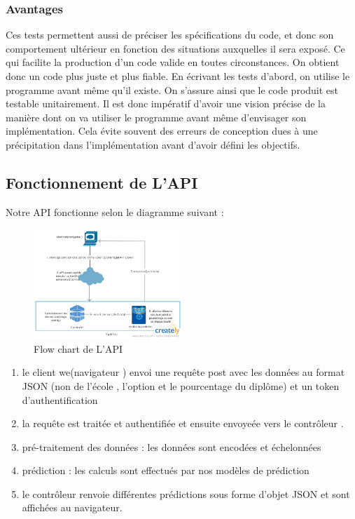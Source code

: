 \subsubsection{Avantages }
Ces tests permettent aussi de préciser les spécifications du code, et donc son comportement ultérieur en fonction des situations auxquelles il sera exposé. Ce qui facilite la production d'un code valide en toutes circonstances. On obtient donc un code plus juste et plus fiable. En écrivant les tests d'abord, on utilise le programme avant même qu'il existe. On s'assure ainsi que le code produit est testable unitairement. Il est donc impératif d'avoir une vision précise de la manière dont on va utiliser le programme avant même d'envisager son implémentation. Cela évite souvent des erreurs de conception dues à une précipitation dans l'implémentation avant d'avoir défini les objectifs.
\subsection{Fonctionnement de L'\ac{API}} 
Notre \ac{API} fonctionne selon le diagramme suivant :
\begin{figure}[H]
	\centering
	\includegraphics[width=0.5\textwidth]{fig/New-Predictive-Model.png}
	\caption{Flow chart de L'API }
	\label{fig:flowChart}
\end{figure}  
\begin{enumerate}
	\item le client we(navigateur ) envoi une requête post avec les données au format \ac{JSON} (non de l'école , l'option et le pourcentage du diplôme) et un token d'authentification 
	\item la requête est traitée et authentifiée et ensuite envoyeée vers le contrôleur .
	\item  pré-traitement des données : les données sont encodées et échelonnées 
	\item  prédiction : les calculs sont effectués par nos modèles de prédiction 
	\item le contrôleur renvoie différentes prédictions sous forme d'objet \ac{JSON} et sont affichées au navigateur.  
\end{enumerate}


